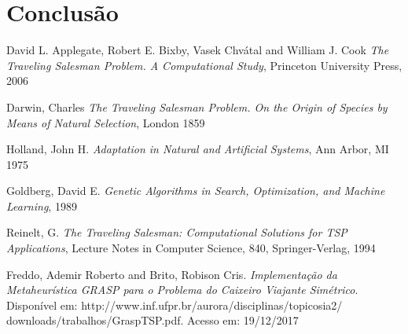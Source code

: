 \documentclass[
article,			%
11pt,				%
oneside,			%
a4paper,			%
english,			%
brazil,				%
sumario=tradicional
]{article}
\begin{document}
	
	\section{Conclusão}
	

	\begin{thebibliography}{4}
		
		
		David L. Applegate, Robert E. Bixby, Vasek Chvátal and William J. Cook
		\emph{The Traveling Salesman Problem. A Computational Study},
		Princeton University Press,
		2006
		
		Darwin, Charles
		\emph{The Traveling Salesman Problem. On the Origin of Species by Means of Natural Selection},
		London
		1859
		
		Holland, John H.
		\emph{Adaptation in Natural and Artificial Systems},
		Ann Arbor, MI
		1975
		
		Goldberg, David E.
		\emph{Genetic Algorithms in Search, Optimization, and Machine Learning},
		1989
		
		Reinelt, G.
		\emph{The Traveling Salesman: Computational Solutions for TSP Applications},
		Lecture Notes in Computer Science, 840, Springer-Verlag,
		1994
		
		Freddo, Ademir Roberto and Brito, Robison Cris.
		\emph{Implementação da Metaheurística GRASP para o Problema
			do Caixeiro Viajante Simétrico}.
		Disponível em: http://www.inf.ufpr.br/aurora/disciplinas/topicosia2/
		downloads/trabalhos/GraspTSP.pdf.
		Acesso em: 19/12/2017
			
	\end{thebibliography}
	
\end{document}
